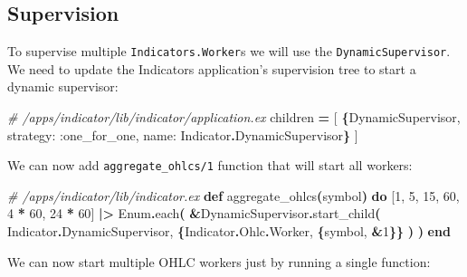 \documentclass[
  oneside]{book}
\newenvironment{Shaded}{\begin{snugshade}}{\end{snugshade}}
\newcommand{\CommentTok}[1]{\textcolor[rgb]{0.56,0.35,0.01}{\textit{#1}}}
\newcommand{\ConstantTok}[1]{\textcolor[rgb]{0.56,0.35,0.01}{#1}}
\newcommand{\DecValTok}[1]{\textcolor[rgb]{0.00,0.00,0.81}{#1}}
\newcommand{\FunctionTok}[1]{\textcolor[rgb]{0.13,0.29,0.53}{\textbf{#1}}}
\newcommand{\KeywordTok}[1]{\textcolor[rgb]{0.13,0.29,0.53}{\textbf{#1}}}
\newcommand{\NormalTok}[1]{#1}
\newcommand{\OperatorTok}[1]{\textcolor[rgb]{0.81,0.36,0.00}{\textbf{#1}}}
\newcommand{\OtherTok}[1]{\textcolor[rgb]{0.56,0.35,0.01}{#1}}
\newcommand{\VariableTok}[1]{\textcolor[rgb]{0.00,0.00,0.00}{#1}}
\begin{document}
\subsection{Supervision}\label{supervision}

To supervise multiple \texttt{Indicators.Worker}s we will use the \texttt{DynamicSupervisor}.
We need to update the Indicators application's supervision tree to start a dynamic supervisor:

\begin{Shaded}
\begin{Highlighting}[]
\CommentTok{\# /apps/indicator/lib/indicator/application.ex}
\NormalTok{    children }\OperatorTok{=} \OtherTok{[}
      \FunctionTok{\{}\ConstantTok{DynamicSupervisor}\NormalTok{, }\VariableTok{strategy:} \VariableTok{:one\_for\_one}\NormalTok{, }\VariableTok{name:} \ConstantTok{Indicator}\OperatorTok{.}\ConstantTok{DynamicSupervisor}\FunctionTok{\}}
    \OtherTok{]}
\end{Highlighting}
\end{Shaded}

\newpage

We can now add \texttt{aggregate\_ohlcs/1} function that will start all workers:

\begin{Shaded}
\begin{Highlighting}[]
\CommentTok{\# /apps/indicator/lib/indicator.ex}
  \KeywordTok{def}\NormalTok{ aggregate\_ohlcs}\FunctionTok{(}\NormalTok{symbol}\FunctionTok{)} \KeywordTok{do}
    \OtherTok{[}\DecValTok{1}\NormalTok{, }\DecValTok{5}\NormalTok{, }\DecValTok{15}\NormalTok{, }\DecValTok{60}\NormalTok{, }\DecValTok{4} \OperatorTok{*} \DecValTok{60}\NormalTok{, }\DecValTok{24} \OperatorTok{*} \DecValTok{60}\OtherTok{]}
    \OperatorTok{|\textgreater{}} \ConstantTok{Enum}\OperatorTok{.}\NormalTok{each}\FunctionTok{(}
      \OperatorTok{\&}\ConstantTok{DynamicSupervisor}\OperatorTok{.}\NormalTok{start\_child}\FunctionTok{(}
        \ConstantTok{Indicator}\OperatorTok{.}\ConstantTok{DynamicSupervisor}\NormalTok{,}
        \FunctionTok{\{}\ConstantTok{Indicator}\OperatorTok{.}\ConstantTok{Ohlc}\OperatorTok{.}\ConstantTok{Worker}\NormalTok{, }\FunctionTok{\{}\NormalTok{symbol, }\OperatorTok{\&}\DecValTok{1}\FunctionTok{\}\}}
      \FunctionTok{)}
    \FunctionTok{)}
  \KeywordTok{end}
\end{Highlighting}
\end{Shaded}

We can now start multiple OHLC workers just by running a single function:
\end{document}
